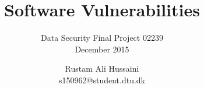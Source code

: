 
\title{Software Vulnerabilities  }
\subtitle{Data Security Final Project 02239 \\ December 2015}
\author{
 Rustam Ali Hussaini \\
  s150962@student.dtu.dk
  }


\maketitle
